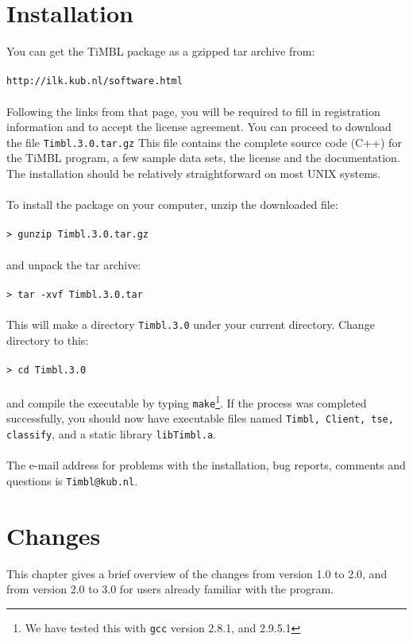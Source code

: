 \documentclass{report}
\begin{document}
\chapter{Installation}
\vspace{-1cm}
You can get the TiMBL package as a gzipped tar archive from:\\
\\
{\tt http://ilk.kub.nl/software.html}\\
\\
Following the links from that page, you will be required to fill in
registration information and to accept the license agreement. You can
proceed to download the file {\tt Timbl.3.0.tar.gz} This file contains the complete source code (C++) for the TiMBL
program, a few sample data sets, the license and the documentation. The
installation should be relatively straightforward on most UNIX systems.\\
\\
To install the package on your computer, unzip the downloaded file:\\
\\
{\tt > gunzip Timbl.3.0.tar.gz}\\
\\
and unpack the tar archive:\\
\\
{\tt > tar -xvf Timbl.3.0.tar}\\
\\
This will make a directory {\tt Timbl.3.0} under your 
current directory. Change directory to this:\\
\\
{\tt > cd Timbl.3.0}\\
\\
and compile the executable by typing {\tt make}\footnote{We have
tested this with {\tt gcc} version 2.8.1,  and 2.9.5.1}.  If
the process was completed successfully, you should now have
executable files named {\tt Timbl, Client, tse, classify}, and a
static library {\tt libTimbl.a}.\\
\\
The e-mail address for problems with the installation, bug reports,
comments and questions is {\tt Timbl@kub.nl}.

\chapter{Changes}
\label{changes}

This chapter gives a brief overview of the changes from version 1.0 to
2.0, and from version 2.0 to 3.0 for users already familiar with the
program.
\end{document}
